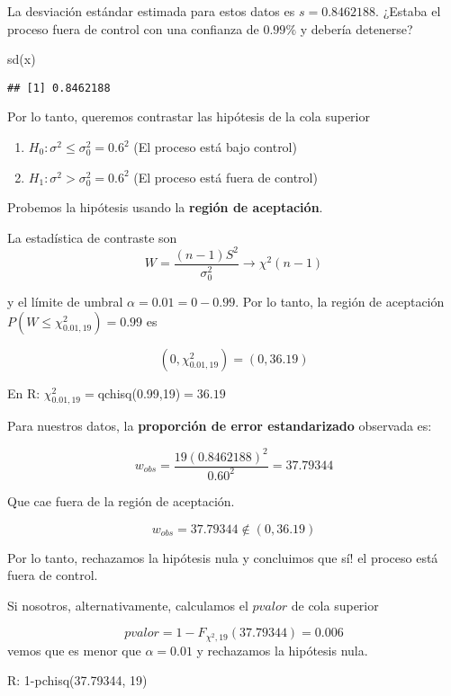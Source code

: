 \documentclass[
]{book}
\newenvironment{Shaded}{\begin{snugshade}}{\end{snugshade}}
\newcommand{\FunctionTok}[1]{\textcolor[rgb]{0.00,0.00,0.00}{#1}}
\newcommand{\NormalTok}[1]{#1}
\providecommand{\tightlist}{%
  \setlength{\itemsep}{0pt}\setlength{\parskip}{0pt}}
\begin{document}
La desviación estándar estimada para estos datos es \(s=0.8462188\). ¿Estaba el proceso fuera de control con una confianza de \(0.99\%\) y debería detenerse?

\begin{Shaded}
\begin{Highlighting}[]
\FunctionTok{sd}\NormalTok{(x)}
\end{Highlighting}
\end{Shaded}

\begin{verbatim}
## [1] 0.8462188
\end{verbatim}

Por lo tanto, queremos contrastar las hipótesis de la cola superior

\begin{enumerate}
\def\labelenumi{\alph{enumi}.}
\tightlist
\item
  \(H_0:\sigma^2 \leq \sigma^2_0=0.6^2\) (El proceso está bajo control)
\item
  \(H_1:\sigma^2 > \sigma^2_0=0.6^2\) (El proceso está fuera de control)
\end{enumerate}

Probemos la hipótesis usando la \textbf{región de aceptación}.

La estadística de contraste son \[W=\frac{(n-1)S^2}{\sigma_0^2} \rightarrow \chi^2(n-1)\]

y el límite de umbral \(\alpha=0.01=0-0.99\). Por lo tanto, la región de aceptación \(P(W\leq \chi^2_{0.01,19})=0.99\) es

\[(0, \chi^2_{0.01,19})=(0,36.19)\]

En R: \(\chi^2_{0.01,19}=\)qchisq(0.99,19)\(= 36.19\)

Para nuestros datos, la \textbf{proporción de error estandarizado} observada es:

\[w_{obs}=\frac{19 (0.8462188)^2}{0.60^2}=37.79344\]

Que cae fuera de la región de aceptación.

\[w_{obs}=37.79344\notin (0,36.19)\]

Por lo tanto, rechazamos la hipótesis nula y concluimos que sí! el proceso está fuera de control.

Si nosotros, alternativamente, calculamos el \(pvalor\) de cola superior

\[pvalor=1-F_{\chi^2,19}(37.79344)= 0.006\]
vemos que es menor que \(\alpha=0.01\) y rechazamos la hipótesis nula.

R: 1-pchisq(37.79344, 19)
\end{document}
